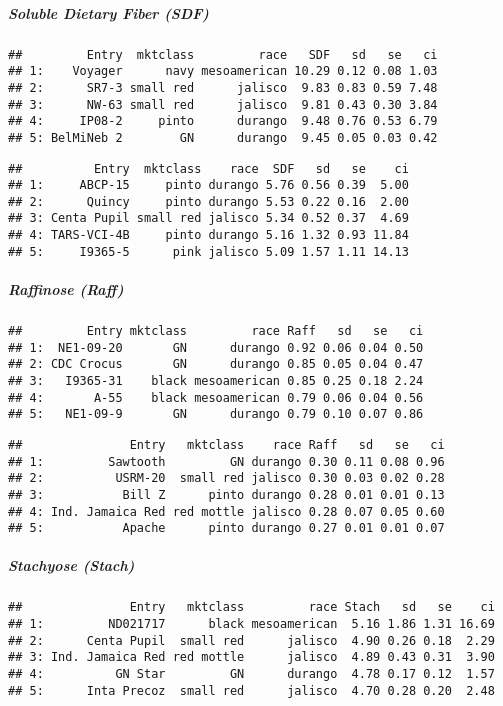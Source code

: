 \documentclass[12pt,]{article}
\begin{document}
\subparagraph{Soluble Dietary Fiber
(SDF)}\label{soluble-dietary-fiber-sdf}

\begin{verbatim}
##         Entry  mktclass         race   SDF   sd   se   ci
## 1:    Voyager      navy mesoamerican 10.29 0.12 0.08 1.03
## 2:      SR7-3 small red      jalisco  9.83 0.83 0.59 7.48
## 3:      NW-63 small red      jalisco  9.81 0.43 0.30 3.84
## 4:     IP08-2     pinto      durango  9.48 0.76 0.53 6.79
## 5: BelMiNeb 2        GN      durango  9.45 0.05 0.03 0.42
\end{verbatim}

\begin{verbatim}
##          Entry  mktclass    race  SDF   sd   se    ci
## 1:     ABCP-15     pinto durango 5.76 0.56 0.39  5.00
## 2:      Quincy     pinto durango 5.53 0.22 0.16  2.00
## 3: Centa Pupil small red jalisco 5.34 0.52 0.37  4.69
## 4: TARS-VCI-4B     pinto durango 5.16 1.32 0.93 11.84
## 5:     I9365-5      pink jalisco 5.09 1.57 1.11 14.13
\end{verbatim}

\subparagraph{Raffinose (Raff)}\label{raffinose-raff}

\begin{verbatim}
##         Entry mktclass         race Raff   sd   se   ci
## 1:  NE1-09-20       GN      durango 0.92 0.06 0.04 0.50
## 2: CDC Crocus       GN      durango 0.85 0.05 0.04 0.47
## 3:   I9365-31    black mesoamerican 0.85 0.25 0.18 2.24
## 4:       A-55    black mesoamerican 0.79 0.06 0.04 0.56
## 5:   NE1-09-9       GN      durango 0.79 0.10 0.07 0.86
\end{verbatim}

\begin{verbatim}
##               Entry   mktclass    race Raff   sd   se   ci
## 1:         Sawtooth         GN durango 0.30 0.11 0.08 0.96
## 2:          USRM-20  small red jalisco 0.30 0.03 0.02 0.28
## 3:           Bill Z      pinto durango 0.28 0.01 0.01 0.13
## 4: Ind. Jamaica Red red mottle jalisco 0.28 0.07 0.05 0.60
## 5:           Apache      pinto durango 0.27 0.01 0.01 0.07
\end{verbatim}

\subparagraph{Stachyose (Stach)}\label{stachyose-stach}

\begin{verbatim}
##               Entry   mktclass         race Stach   sd   se    ci
## 1:         ND021717      black mesoamerican  5.16 1.86 1.31 16.69
## 2:      Centa Pupil  small red      jalisco  4.90 0.26 0.18  2.29
## 3: Ind. Jamaica Red red mottle      jalisco  4.89 0.43 0.31  3.90
## 4:          GN Star         GN      durango  4.78 0.17 0.12  1.57
## 5:      Inta Precoz  small red      jalisco  4.70 0.28 0.20  2.48
\end{verbatim}
\end{document}
